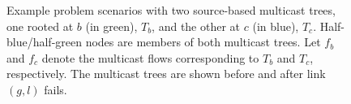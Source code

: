 
\begin{figure}[t]
  \begin{center}
  \end{center}
\caption{Example problem scenarios with two source-based multicast trees, one rooted at $b$ (in green), $T_b$, and the other at $c$ (in blue), $T_c$. Half-blue/half-green nodes are members of 
both multicast trees. Let $f_b$ and $f_c$ denote the multicast flows corresponding to $T_b$ and $T_c$, respectively.  The multicast trees are shown before and after link $(g,l)$ fails. }
\label{fig:intuition-example}
\end{figure}


